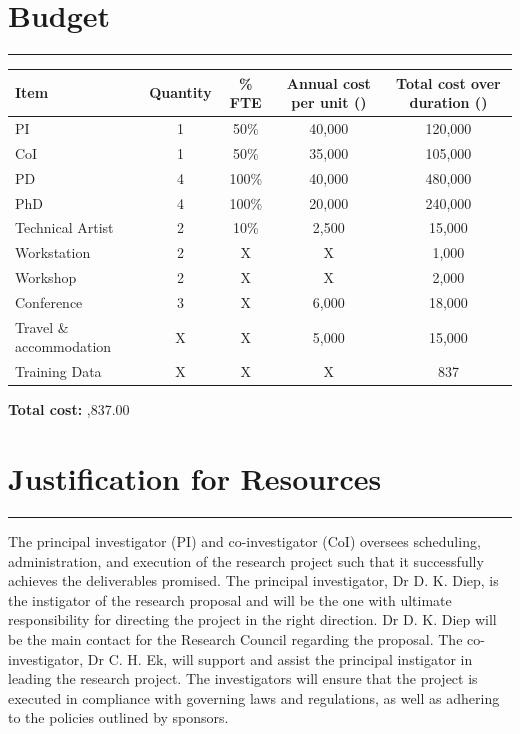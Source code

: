 \documentclass[a4paper, 11pt, onecolumn]{article} %
\numberwithin{equation}{section} %
\numberwithin{figure}{section} %
\numberwithin{table}{section} %
\begin{document}



\newpage

\section*{Budget}
\hrule\vspace{0.5em}

\begin{table}[!h]
	\centering
	{\renewcommand{\arraystretch}{1.8} %
	\begin{tabular}{|l|c|c|c|c|}
		\hline
		Item		& Quantity	& \% FTE	& Annual cost per unit (\textsterling)	& Total cost over duration (\textsterling)\\
		\hline
		PI			& 1			& 50\%		& 40,000				& 120,000\\
		\hline
		CoI			& 1			& 50\%		& 35,000				& 105,000\\
		\hline
		PD			& 4			& 100\%		& 40,000				& 480,000\\
		\hline
		PhD			& 4			& 100\%		& 20,000				& 240,000\\
		\hline
		Technical Artist & 2 	& 10\%		& 2,500					& 15,000\\
		\hline
		Workstation	& 2			& X			& X						& 1,000\\		
		\hline
		Workshop	& 2			& X			& X						& 2,000\\		
		\hline
		Conference	& 3			& X			& 6,000					& 18,000\\		
		\hline
		Travel \& accommodation & X		& X	& 5,000					& 15,000\\		
		\hline
		Training Data& X		& X			& X						& 837\\
		\hline
	\end{tabular}
	}
\end{table}

\vspace{1cm}

\textbf{Total cost:} ,837.00

\newpage

\section*{Justification for Resources}
\hrule\vspace{0.5em}

The principal investigator (PI) and co-investigator (CoI) oversees scheduling, administration, and execution of the research project such that it successfully achieves the deliverables promised.
The principal investigator, Dr D. K. Diep, is the instigator of the research proposal and will be the one with ultimate responsibility for directing the project in the right direction. Dr D. K. Diep will be the main contact for the Research Council regarding the proposal.
The co-investigator, Dr C. H. Ek, will support and assist the principal instigator in leading the research project.
The investigators will ensure that the project is executed in compliance with governing laws and regulations, as well as adhering to the policies outlined by sponsors.
\end{document}
